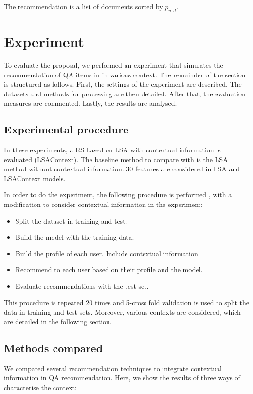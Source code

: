 \documentclass[preprint]{elsarticle}
\begin{document}
\begin{spacing}{1.5}
The recommendation is a list of documents sorted by $p_{u,d}$.

\section{Experiment}
\label{sec:case-study}

To evaluate the proposal, we performed an experiment that simulates the recommendation of QA items in in various context. The remainder of the section is structured as follows. First, the settings of the experiment are described. The datasets and methods for processing are then detailed. After that, the evaluation measures are commented. Lastly, the results are analysed.

\subsection{Experimental procedure}

In these experiments, a RS based on LSA with contextual information is evaluated (LSAContext). The baseline method to compare with is the LSA method without contextual information. 30 features are considered in LSA and LSAContext models.

In order to do the experiment, the following procedure is performed \cite{Sarwar2001}, with a modification to consider contextual information in the experiment:
\begin{itemize}
	\item Split the dataset in training and test.
	\item Build the model with the training data.
	\item Build the profile of each user. Include contextual information.
	\item Recommend to each user based on their profile and the model.
	\item Evaluate recommendations with the test set.
\end{itemize}

This procedure is repeated 20 times and 5-cross fold validation is used to split the data in training and test sets. Moreover, various contexts are considered, which are detailed in the following section.

\subsection{Methods compared}

We compared several recommendation techniques to integrate contextual information in QA recommendation. Here, we show the results of three ways of characterise the context:


\end{spacing}
\end{document}
